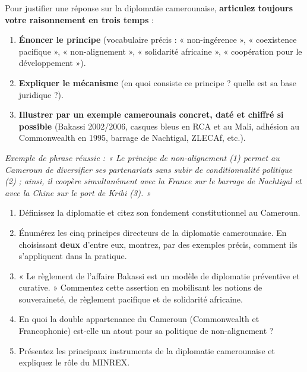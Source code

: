 \documentclass[11pt]{article}
\begin{document}
\begin{methode}
Pour justifier une réponse sur la diplomatie camerounaise, \textbf{articulez toujours votre raisonnement en trois temps} :
\begin{enumerate}
    \item \textbf{Énoncer le principe} (vocabulaire précis : « non-ingérence », « coexistence pacifique », « non-alignement », « solidarité africaine », « coopération pour le développement »).
    \item \textbf{Expliquer le mécanisme} (en quoi consiste ce principe ? quelle est sa base juridique ?).
    \item \textbf{Illustrer par un exemple camerounais concret, daté et chiffré si possible} (Bakassi 2002/2006, casques bleus en RCA et au Mali, adhésion au Commonwealth en 1995, barrage de Nachtigal, ZLECAf, etc.).
\end{enumerate}
\textit{Exemple de phrase réussie : « Le principe de non-alignement (1) permet au Cameroun de diversifier ses partenariats sans subir de conditionnalité politique (2) ; ainsi, il coopère simultanément avec la France sur le barrage de Nachtigal et avec la Chine sur le port de Kribi (3). »}
\end{methode}

\begin{exercice}
\begin{enumerate}
    \item Définissez la diplomatie et citez son fondement constitutionnel au Cameroun.
    \item Énumérez les cinq principes directeurs de la diplomatie camerounaise. En choisissant \textbf{deux} d'entre eux, montrez, par des exemples précis, comment ils s'appliquent dans la pratique.
    \item « Le règlement de l'affaire Bakassi est un modèle de diplomatie préventive et curative. » Commentez cette assertion en mobilisant les notions de souveraineté, de règlement pacifique et de solidarité africaine.
    \item En quoi la double appartenance du Cameroun (Commonwealth et Francophonie) est-elle un atout pour sa politique de non-alignement ?
    \item Présentez les principaux instruments de la diplomatie camerounaise et expliquez le rôle du MINREX.
\end{enumerate}
\end{exercice}
\end{document}

